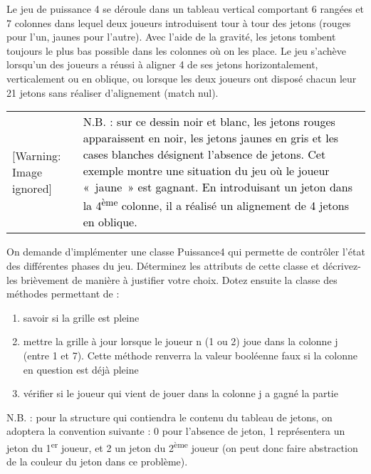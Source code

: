\bigskip

{
Le jeu de puissance 4 se déroule dans un tableau vertical comportant 6
rangées et 7 colonnes dans lequel deux joueurs introduisent tour à tour
des jetons (rouges pour l’un, jaunes pour l’autre). Avec l’aide de la
gravité, les jetons tombent toujours le plus bas possible dans les
colonnes où on les place. Le jeu s’achève lorsqu’un des joueurs a
réussi à aligner 4 de ses jetons horizontalement, verticalement ou en
oblique, ou lorsque les deux joueurs ont disposé chacun leur 21 jetons
sans réaliser d’alignement (match nul).}


\bigskip

\begin{center}
\tablehead{}
\begin{supertabular}{m{3.626cm}m{10.175cm}}
  [Warning: Image ignored] %
  &
 \textcolor{black}{N.B. : sur ce dessin noir et
blanc, les jetons rouges apparaissent en noir, les jetons jaunes en
gris et les cases blanches désignent l'absence de
jetons. Cet exemple montre une situation du jeu où le joueur «~jaune~»
est gagnant. En introduisant un jeton dans la
4}\textcolor{black}{\textsuperscript{ème}}\textcolor{black}{ colonne,
il a réalisé un alignement de 4 jetons en oblique.}\\
\end{supertabular}
\end{center}

\bigskip

{
On demande d’implémenter une classe Puissance4 qui permette de contrôler
l’état des différentes phases du jeu. Déterminez les attributs de cette
classe et décrivez-les brièvement de manière à justifier votre choix.
Dotez ensuite la classe des méthodes permettant de :}

\liststyleNumberingi
\begin{enumerate}
\item {
savoir si la grille est pleine}
\item {
mettre la grille à jour lorsque le joueur n (1 ou 2) joue dans la
colonne j (entre 1 et 7). Cette méthode renverra la valeur booléenne
faux si la colonne en question est déjà pleine}
\item {
vérifier si le joueur qui vient de jouer dans la colonne j a gagné la
partie}
\end{enumerate}
{
N.B. : pour la structure qui contiendra le contenu du tableau de jetons,
on adoptera la convention suivante : 0 pour l’absence de jeton, 1
représentera un jeton du 1\textsuperscript{er} joueur, et 2 un jeton du
2\textsuperscript{ème} joueur (on peut donc faire abstraction de la
couleur du jeton dans ce problème).}

